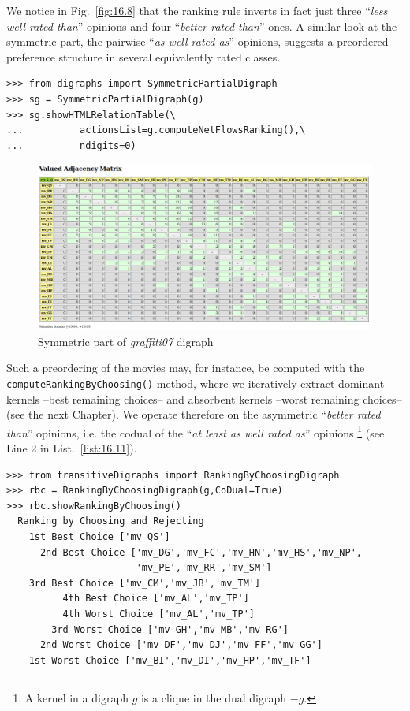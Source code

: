 We notice in Fig.~\vref{fig:16.8} that the \NetFlows ranking rule inverts in fact just three ``\emph{less well rated than}'' opinions and four ``\emph{better rated than}'' ones. A similar look at the symmetric part, the pairwise ``\emph{as well rated as}'' opinions, suggests a preordered preference structure in several equivalently rated classes. 
\begin{lstlisting}
>>> from digraphs import SymmetricPartialDigraph
>>> sg = SymmetricPartialDigraph(g)
>>> sg.showHTMLRelationTable(\
...          actionsList=g.computeNetFlowsRanking(),\
...          ndigits=0)
\end{lstlisting}
\begin{figure}[h]
\includegraphics[width=12cm]{Figures/symmetricPart.png}
\caption{Symmetric part of \emph{graffiti07} digraph}
\label{fig:16.9}       %
\end{figure}
Such a preordering of the movies may, for instance, be computed with the \texttt{computeRankingByChoosing()} method, where we iteratively extract dominant kernels --best remaining choices-- and absorbent kernels --worst remaining choices-- (see the next Chapter). We operate therefore on the asymmetric ``\emph{better rated than}'' opinions, i.e. the codual of the ``\emph{at least as well rated as}'' opinions \footnote{A kernel in a digraph $g$ is a clique in the dual digraph $-g$.} (see Line 2 in List.~\vref{list:16.11}).
\begin{lstlisting}[caption={Bipolar ranking-by-choosing the Grafitti movies},label=list:11]
>>> from transitiveDigraphs import RankingByChoosingDigraph
>>> rbc = RankingByChoosingDigraph(g,CoDual=True)
>>> rbc.showRankingByChoosing()
  Ranking by Choosing and Rejecting
    1st Best Choice ['mv_QS']
      2nd Best Choice ['mv_DG','mv_FC','mv_HN','mv_HS','mv_NP',
                       'mv_PE','mv_RR','mv_SM']
	3rd Best Choice ['mv_CM','mv_JB','mv_TM']
          4th Best Choice ['mv_AL','mv_TP']
          4th Worst Choice ['mv_AL','mv_TP']
        3rd Worst Choice ['mv_GH','mv_MB','mv_RG']
      2nd Worst Choice ['mv_DF','mv_DJ','mv_FF','mv_GG']
    1st Worst Choice ['mv_BI','mv_DI','mv_HP','mv_TF']
\end{lstlisting}

